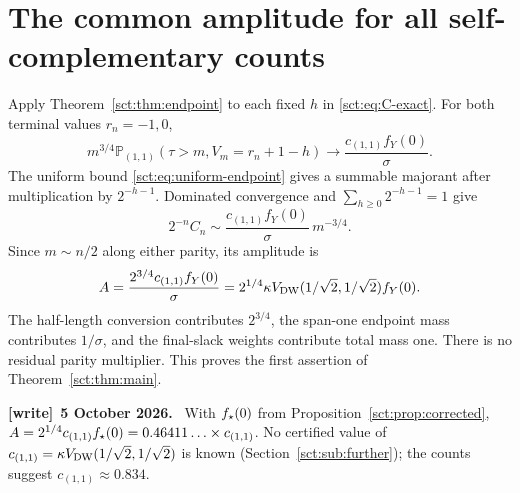 \documentclass[11pt,letterpaper]{article}
\theoremstyle{definition}\newtheorem{remark}[theorem]{Remark}
\newcommand{\Pp}{\mathbb P}\newcommand{\Ee}{\mathbb E}
\newcommand{\fY}{f_Y}\newcommand{\code}[1]{\texttt{#1}}
\newenvironment{writenote}[1][]{\par\smallskip\begingroup\small
 \noindent\textbf{[write]}\if\relax\detokenize{#1}\relax\else~\textbf{#1.}\fi\ }%
 {\par\endgroup\smallskip}
\begin{document}
\section{The common amplitude for all self-complementary counts}\label{sct:sec:C}
Apply Theorem~\ref{sct:thm:endpoint} to each fixed $h$ in \eqref{sct:eq:C-exact}.
For both terminal values $r_n=-1,0$,
\[
 m^{3/4}\Pp_{(1,1)}(\tau>m,V_m=r_n+1-h)
 \longrightarrow\frac{c_{(1,1)}\fY(0)}{\sigma}.
\]
The uniform bound \eqref{sct:eq:uniform-endpoint} gives a summable majorant after
multiplication by $2^{-h-1}$. Dominated convergence and
$\sum_{h\ge0}2^{-h-1}=1$ give
\begin{equation}\label{sct:eq:C-asymptotic}
 2^{-n}C_n\sim\frac{c_{(1,1)}\fY(0)}{\sigma}\,m^{-3/4}.
\end{equation}
Since $m\sim n/2$ along either parity, its amplitude is
\[
 A=\frac{2^{3/4}c_{(1,1)}\fY(0)}{\sigma}
   =2^{1/4}\kappa\Vdw(1/\sqrt2,1/\sqrt2)\fY(0).
\]
The half-length conversion contributes $2^{3/4}$, the span-one endpoint mass
contributes $1/\sigma$, and the final-slack weights contribute total mass one.
There is no residual parity multiplier. This proves the first assertion of
Theorem~\ref{sct:thm:main}.
\begin{writenote}[5 October 2026]
With $f_\star(0)$ from Proposition~\ref{sct:prop:corrected}, $A=2^{1/4}c_{(1,1)}f_\star(0)=0.46411\ldots\times c_{(1,1)}$. No certified value of $c_{(1,1)}=\kappa V_{\mathrm{DW}}(1/\sqrt2,1/\sqrt2)$ is known (Section~\ref{sct:sub:further}); the counts suggest $c_{(1,1)}\approx0.834$.
\end{writenote}
\end{document}
